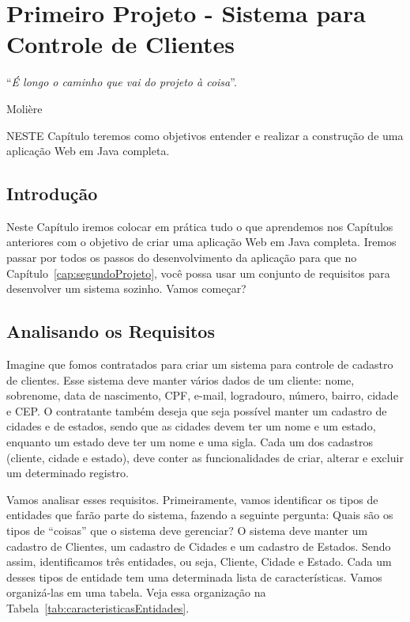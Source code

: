 \chapter{Primeiro Projeto - Sistema para Controle de Clientes}\label{cap:primeiroProjeto}
\epigraph{``\textit{É longo o caminho que vai do projeto à coisa}''.}{Molière}

\lettrine[lines=4, lhang=0.1, lraise=0, loversize=0.2, findent=0.1em]{\textcolor{corAzulTema}{N}}{ESTE} Capítulo teremos como objetivos entender e realizar a construção de uma aplicação Web em Java completa.


\section{Introdução}

Neste Capítulo iremos colocar em prática tudo o que aprendemos nos Capítulos anteriores com o objetivo de criar uma aplicação Web em Java completa. Iremos passar por todos os passos do desenvolvimento da aplicação para que no Capítulo~\ref{cap:segundoProjeto}, você possa usar um conjunto de requisitos para desenvolver um sistema sozinho. Vamos começar?


\section{Analisando os Requisitos}

Imagine que fomos contratados para criar um sistema para controle de cadastro de clientes. Esse sistema deve manter vários dados de um cliente: nome, sobrenome, data de nascimento, CPF, e-mail, logradouro, número, bairro, cidade e CEP. O contratante também deseja que seja possível manter um cadastro de cidades e de estados, sendo que as cidades devem ter um nome e um estado, enquanto um estado deve ter um nome e uma sigla. Cada um dos cadastros (cliente, cidade e estado), deve conter as funcionalidades de criar, alterar e excluir um determinado registro.

Vamos analisar esses requisitos. Primeiramente, vamos identificar os tipos de entidades que farão parte do sistema, fazendo a seguinte pergunta: Quais são os tipos de ``coisas'' que o sistema deve gerenciar? O sistema deve manter um cadastro de Clientes, um cadastro de Cidades e um cadastro de Estados. Sendo assim, identificamos três entidades, ou seja, Cliente, Cidade e Estado.
Cada um desses tipos de entidade tem uma determinada lista de características. Vamos organizá-las em uma tabela. Veja essa organização na Tabela~\ref{tab:caracteristicasEntidades}.

